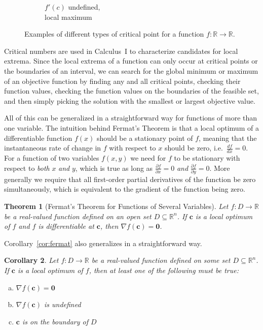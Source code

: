 \documentclass[11pt]{article}
\newtheorem{theorem}{Theorem}[section] %
\newtheorem{corollary}[theorem]{Corollary} %
\theoremstyle{definition} %
\begin{document}
\begin{figure}[h]
\begin{subfigure}{0.3\textwidth}
		\caption{$f'(c)$ undefined,\\local maximum}
	\end{subfigure}
	
	\caption{Examples of different types of critical point for a function $f : \mathbb{R} \to \mathbb{R}$.}
	\label{fig:critical}
\end{figure}

Critical numbers are used in Calculus~I to characterize candidates for local extrema. Since the local extrema of a function can only occur at critical points or the boundaries of an interval, we can search for the global minimum or maximum of an objective function by finding any and all critical points, checking their function values, checking the function values on the boundaries of the feasible set, and then simply picking the solution with the smallest or largest objective value.

All of this can be generalized in a straightforward way for functions of more than one variable. The intuition behind Fermat's Theorem is that a local optimum of a differentiable function $f(x)$ should be a stationary point of $f$, meaning that the instantaneous rate of change in $f$ with respect to $x$ should be zero, i.e.~$\frac{df}{dx} = 0$. For a function of two variables $f(x,y)$ we need for $f$ to be stationary with respect to \textit{both} $x$ \textit{and} $y$, which is true as long as $\frac{\partial f}{\partial x} = 0$ \textit{and} $\frac{\partial f}{\partial y} = 0$. More generally we require that all first-order partial derivatives of the function be zero simultaneously, which is equivalent to the gradient of the function being zero.

\newpage%

\begin{theorem}[Fermat's Theorem for Functions of Several Variables]
\label{thm:fermat2}
	Let $f : D \to \mathbb{R}$ be a real-valued function defined on an open set $D \subseteq \mathbb{R}^n$. If $\mathbf{c}$ is a local optimum of $f$ and $f$ is differentiable at $\mathbf{c}$, then $\nabla f(\mathbf{c}) = \mathbf{0}$.
\end{theorem}

Corollary~\ref{cor:fermat} also generalizes in a straightforward way.

\begin{corollary}
\label{cor:fermat2}
	Let $f : D \to \mathbb{R}$ be a real-valued function defined on some set $D \subseteq \mathbb{R}^n$. If $\mathbf{c}$ is a local optimum of $f$, then at least one of the following must be true:
	\begin{enumerate}[(a)]
		\item $\nabla f(\mathbf{c}) = \mathbf{0}$
		\item $\nabla f(\mathbf{c})$ is undefined
		\item $\mathbf{c}$ is on the boundary of $D$
	\end{enumerate}
\end{corollary}
\end{document}
